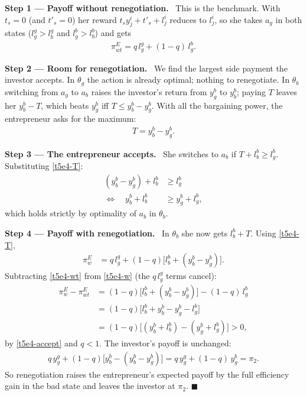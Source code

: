 \documentclass[11pt,a4paper]{article}
\newcommand{\step}[2]{\par\medskip\noindent\textbf{Step #1 --- #2.}~}
\begin{document}
\step{1}{Payoff without renegotiation} This is the benchmark. With $t_s=0$ (and $t'_s=0$) her reward
$t_sy^i_j+t'_s+l^i_j$ reduces to $l^i_j$, so she takes $a_g$ in both states ($l^g_g>l^g_b$ and
$l^b_g>l^b_b$) and gets
\begin{align}
  \pi^E_{wt} = q\,l^g_g+(1-q)\,l^b_g. \label{t5e4-wt}
\end{align}

\step{2}{Room for renegotiation} We find the largest side payment the investor accepts. In $\theta_g$
the action is already optimal; nothing to renegotiate. In $\theta_b$ switching from $a_g$ to $a_b$
raises the investor's return from $y^b_g$ to $y^b_b$; paying $T$ leaves her $y^b_b-T$, which beats $y^b_g$
iff $T\leq y^b_b-y^b_g$. With all the bargaining power, the entrepreneur asks for the maximum:
\begin{align}
  T = y^b_b-y^b_g. \label{t5e4-T}
\end{align}

\step{3}{The entrepreneur accepts} She switches to $a_b$ if $T+l^b_b\geq l^b_g$. Substituting
\eqref{t5e4-T}:
\begin{align}
  (y^b_b-y^b_g)+l^b_b &\geq l^b_g \nonumber\\
  \Longleftrightarrow\quad y^b_b+l^b_b &\geq y^b_g+l^b_g, \label{t5e4-accept}
\end{align}
which holds strictly by optimality of $a_b$ in $\theta_b$.

\step{4}{Payoff with renegotiation} In $\theta_b$ she now gets $l^b_b+T$. Using \eqref{t5e4-T},
\begin{align}
  \pi^E_w &= q\,l^g_g+(1-q)\bigl[l^b_b+(y^b_b-y^b_g)\bigr]. \label{t5e4-w}
\end{align}
Subtracting \eqref{t5e4-wt} from \eqref{t5e4-w} (the $q\,l^g_g$ terms cancel):
\begin{align}
  \pi^E_w-\pi^E_{wt} &= (1-q)\bigl[l^b_b+(y^b_b-y^b_g)\bigr]-(1-q)\,l^b_g \nonumber\\
  &= (1-q)\bigl[l^b_b+y^b_b-y^b_g-l^b_g\bigr] \nonumber\\
  &= (1-q)\bigl[(y^b_b+l^b_b)-(y^b_g+l^b_g)\bigr]>0, \label{t5e4-gain}
\end{align}
by \eqref{t5e4-accept} and $q<1$. The investor's payoff is unchanged:
\begin{align}
  q\,y^g_g+(1-q)\bigl[y^b_b-(y^b_b-y^b_g)\bigr] = q\,y^g_g+(1-q)\,y^b_g = \pi_2. \label{t5e4-inv}
\end{align}
So renegotiation raises the entrepreneur's expected payoff by the full efficiency gain in the bad
state and leaves the investor at $\pi_2$. $\blacksquare$
\end{document}

